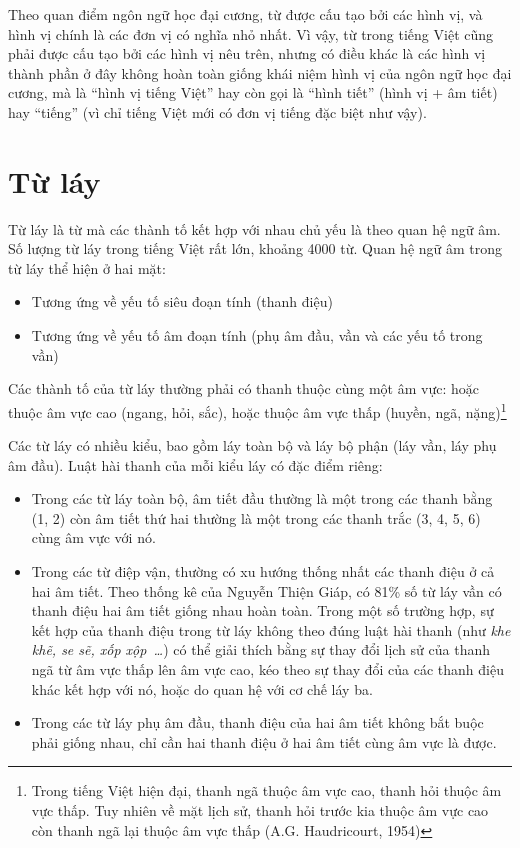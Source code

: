 \documentclass[a4paper,oneside,14pt]{extbook} %
\begin{document}
Theo quan điểm ngôn ngữ học đại cương, từ được cấu tạo bởi các hình
vị, và hình vị chính là các đơn vị có nghĩa nhỏ nhất. Vì vậy, từ trong
tiếng Việt cũng phải được cấu tạo bởi các hình vị nêu trên, nhưng có
điều khác là các hình vị thành phần ở đây không hoàn toàn giống khái
niệm hình vị của ngôn ngữ học đại cương, mà là ``hình vị tiếng Việt''
hay còn gọi là ``hình tiết'' (hình vị + âm tiết) hay ``tiếng'' (vì chỉ
tiếng Việt mới có đơn vị tiếng đặc biệt như vậy).



\section{Từ láy}

Từ láy là từ mà các thành tố kết hợp với nhau chủ yếu là theo quan hệ
ngữ âm. Số lượng từ láy trong tiếng Việt rất lớn, khoảng 4000 từ. Quan
hệ ngữ âm trong từ láy thể hiện ở hai mặt: 
\begin{itemize}
\item Tương ứng về yếu tố siêu đoạn tính (thanh điệu)
\item Tương ứng về yếu tố âm đoạn tính (phụ âm đầu, vần và các yếu tố
  trong vần)
\end{itemize}



Các thành tố của từ láy thường phải có thanh thuộc cùng một âm vực:
hoặc thuộc âm vực cao (ngang, hỏi, sắc), hoặc thuộc âm vực thấp
(huyền, ngã, nặng)\footnote{Trong tiếng Việt hiện đại, thanh ngã thuộc
  âm vực cao, thanh hỏi thuộc âm vực thấp. Tuy nhiên về mặt lịch sử,
  thanh hỏi trước kia thuộc âm vực cao còn thanh ngã lại thuộc âm vực
  thấp (A.G. Haudricourt, 1954)}

Các từ láy có nhiều kiểu, bao gồm láy toàn bộ và láy bộ phận (láy vần,
láy phụ âm đầu). Luật hài thanh của mỗi kiểu láy có đặc điểm riêng:
\begin{itemize}
\item Trong các từ láy toàn bộ, âm tiết đầu thường là một trong các
  thanh bằng (1, 2) còn âm tiết thứ hai thường là một trong các thanh
  trắc (3, 4, 5, 6) cùng âm vực với nó.
\item Trong các từ điệp vận, thường có xu hướng thống nhất các thanh
  điệu ở cả hai âm tiết. Theo thống kê của Nguyễn Thiện Giáp, có 81\%
  số từ láy vần có thanh điệu hai âm tiết giống nhau hoàn toàn. Trong
  một số trường hợp, sự kết hợp của thanh điệu trong từ láy không theo
  đúng luật hài thanh (như \textit{khe khẽ, se sẽ, xốp xộp~\ldots}) có
  thể giải thích bằng sự thay đổi lịch sử của thanh ngã từ âm vực thấp
  lên âm vực cao, kéo theo sự thay đổi của các thanh điệu khác kết hợp
  với nó, hoặc do quan hệ với cơ chế láy ba.
\item Trong các từ láy phụ âm đầu, thanh điệu của hai âm tiết không
  bắt buộc phải giống nhau, chỉ cần hai thanh điệu ở hai âm tiết cùng
  âm vực là được.
\end{itemize}
\end{document}

